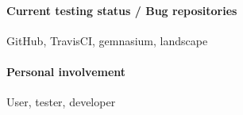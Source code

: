 \paragraph{Current testing status / Bug repositories}

GitHub, TravisCI, gemnasium, landscape

\paragraph{Personal involvement}

User, tester, developer

